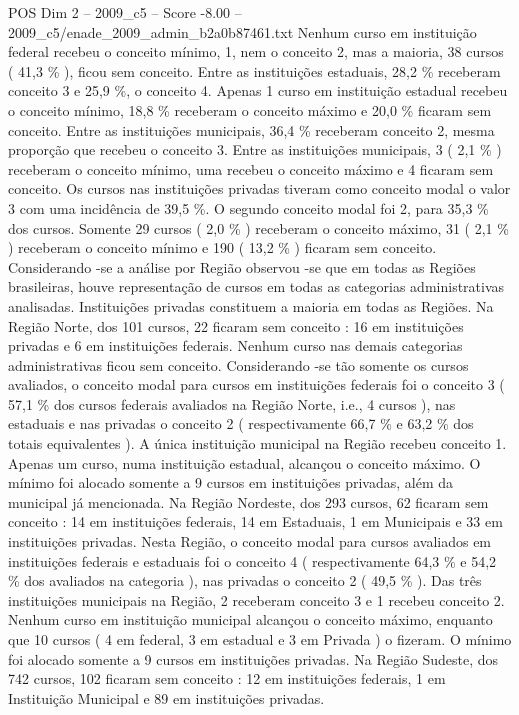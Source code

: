 \begin{textsample}{POS Dim 2 – 2009\_c5 – Score -8.00 – 2009\_c5/enade\_2009\_admin\_b2a0b87461.txt}
Nenhum curso em instituição federal recebeu o conceito mínimo, 1, nem o conceito 2, mas a maioria, 38 cursos ( 41,3 \% ), ficou sem conceito.
Entre as instituições estaduais, 28,2 \% receberam conceito 3 e 25,9 \%, o conceito 4.
Apenas 1 curso em instituição estadual recebeu o conceito mínimo, 18,8 \% receberam o conceito máximo e 20,0 \% ficaram sem conceito.
Entre as instituições municipais, 36,4 \% receberam conceito 2, mesma proporção que recebeu o conceito 3.
Entre as instituições municipais, 3 ( 2,1 \% ) receberam o conceito mínimo, uma recebeu o conceito máximo e 4 ficaram sem conceito.
Os cursos nas instituições privadas tiveram como conceito modal o valor 3 com uma incidência de 39,5 \%.
O segundo conceito modal foi 2, para 35,3 \% dos cursos.
Somente 29 cursos ( 2,0 \% ) receberam o conceito máximo, 31 ( 2,1 \% ) receberam o conceito mínimo e 190 ( 13,2 \% ) ficaram sem conceito.
Considerando -se a análise por Região observou -se que em todas as Regiões brasileiras, houve representação de cursos em todas as categorias administrativas analisadas.
Instituições privadas constituem a maioria em todas as Regiões.
Na Região Norte, dos 101 cursos, 22 ficaram sem conceito : 16 em instituições privadas e 6 em instituições federais.
Nenhum curso nas demais categorias administrativas ficou sem conceito.
Considerando -se tão somente os cursos avaliados, o conceito modal para cursos em instituições federais foi o conceito 3 ( 57,1 \% dos cursos federais avaliados na Região Norte, i.e., 4 cursos ), nas estaduais e nas privadas o conceito 2 ( respectivamente 66,7 \% e 63,2 \% dos totais equivalentes ).
A única instituição municipal na Região recebeu conceito 1.
Apenas um curso, numa instituição estadual, alcançou o conceito máximo.
O mínimo foi alocado somente a 9 cursos em instituições privadas, além da municipal já mencionada.
Na Região Nordeste, dos 293 cursos, 62 ficaram sem conceito : 14 em instituições federais, 14 em Estaduais, 1 em Municipais e 33 em instituições privadas.
Nesta Região, o conceito modal para cursos avaliados em instituições federais e estaduais foi o conceito 4 ( respectivamente 64,3 \% e 54,2 \% dos avaliados na categoria ), nas privadas o conceito 2 ( 49,5 \% ).
Das três instituições municipais na Região, 2 receberam conceito 3 e 1 recebeu conceito 2.
Nenhum curso em instituição municipal alcançou o conceito máximo, enquanto que 10 cursos ( 4 em federal, 3 em estadual e 3 em Privada ) o fizeram.
O mínimo foi alocado somente a 9 cursos em instituições privadas.
Na Região Sudeste, dos 742 cursos, 102 ficaram sem conceito : 12 em instituições federais, 1 em Instituição Municipal e 89 em instituições privadas.

\end{textsample}
